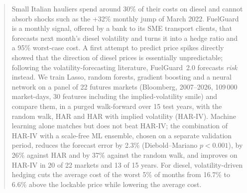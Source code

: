 \begin{abstract}
\noindent Small Italian hauliers spend around 30\% of their costs on diesel and cannot absorb shocks such
as the +32\% monthly jump of March 2022. FuelGuard is a monthly signal, offered by a bank to its SME transport
clients, that forecasts next month's diesel volatility and turns it into a hedge ratio and a 95\%
worst-case cost. A first attempt to predict price spikes directly showed that the direction of diesel prices is
essentially unpredictable; following the volatility-forecasting literature, FuelGuard~2.0 forecasts
\emph{risk} instead. We train Lasso, random forests, gradient boosting and a neural network on a panel of 22
futures markets (Bloomberg, 2007--2026, 109\,000 market-days, 30 features including the implied-volatility
smile) and compare them, in a purged walk-forward over 15 test years, with the random walk, HAR and HAR with
implied volatility (HAR-IV). Machine learning alone matches but does not beat HAR-IV; the combination of
HAR-IV with a scale-free ML ensemble, chosen on a separate validation period, reduces the forecast error by
2.3\% (Diebold--Mariano $p<0.001$), by 26\% against HAR and by 37\% against the random walk, and improves
on HAR-IV in 20 of 22 markets and 13 of 15 years. For diesel, volatility-driven hedging cuts the average cost
of the worst 5\% of months from 16.7\% to 6.6\% above the lockable price while lowering the average cost.
\end{abstract}
